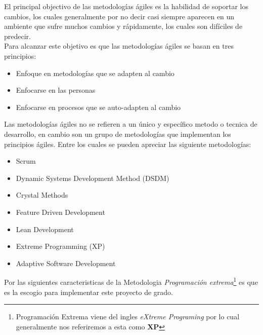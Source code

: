 
    El principal objectivo de las metodologías ágiles es la habilidad de soportar los cambios, los cuales generalmente por no decir casi siempre aparecen en un ambiente que sufre muchos cambios y rápidamente, los cuales son difíciles de predecir.\cite{6}\\


    Para alcanzar este objetivo es que las metodologías ágiles se basan en tres principios\cite{8}:

\begin{itemize}
  \item Enfoque en metodologías que se adapten al cambio
  \item Enfocarse en las personas
  \item Enfocarse en procesos que se auto-adapten al cambio
\end{itemize}

    Las metodologías ágiles no se refieren a un único y específico metodo o tecnica de desarrollo, en cambio son un grupo de metodologías que implementan los principios ágiles. Entre los cuales se pueden apreciar las siguiente metodologías:\\

    \begin{itemize}
      \item Scrum
      \item Dynamic Systems Development Method (DSDM)
      \item Crystal Methods
      \item Feature Driven Development
      \item Lean Development
      \item Extreme Programming (XP)
      \item Adaptive Software Development
    \end{itemize}


    Por las siguientes caracteristicas de la Metodologia \emph{Programaci\'on extrema}\footnote{Programaci\'on Extrema viene del ingles \emph{eXtreme Programing} por lo cual generalmente nos referiremos a esta como \textbf{XP}} es que es la escogio para implementar este proyecto de grado.



